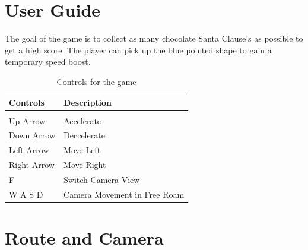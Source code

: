 \documentclass[11pt]{report}
\begin{document}
\section*{User Guide}
The goal of the game is to collect as many chocolate Santa Clause's as possible to get a high score. The player can pick up the blue pointed shape to gain a temporary speed boost.
    \begin{table}[H]
        \begin{center}
            \begin{tabular}{|l|l|}
            \hline
            \textbf{Controls}    & \textbf{Description}  \\
            \hline
              &  \\[0.5pt]
              Up Arrow    & Accelerate                   \\[10pt]
              Down Arrow  & Deccelerate                  \\[10pt]
              Left Arrow  & Move Left                    \\[10pt]
              Right Arrow & Move Right                   \\[10pt] 
              F           & Switch Camera View           \\[10pt]
              W A S D     & Camera Movement in Free Roam \\[10pt]
            \hline
            \end{tabular}
            \caption{Controls for the game}
        \end{center}
    \end{table}


\section*{Route and Camera}

\end{document}

